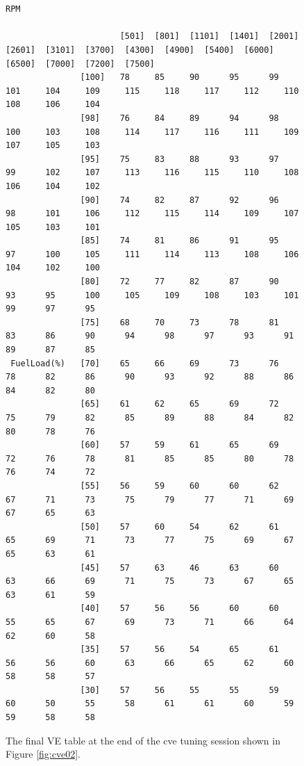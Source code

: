 \documentclass{article}
\begin{document}
\begin{figure}
\tiny
\begin{verbatim}

                                                                        RPM

                       [501]  [801]  [1101]  [1401]  [2001]  [2601]  [3101]  [3700]  [4300]  [4900]  [5400]  [6000]  [6500]  [7000]  [7200]  [7500]
               [100]   78     85     90      95      99      101     104     109     115     118     117     112     110     108     106     104   
               [98]    76     84     89      94      98      100     103     108     114     117     116     111     109     107     105     103   
               [95]    75     83     88      93      97      99      102     107     113     116     115     110     108     106     104     102   
               [90]    74     82     87      92      96      98      101     106     112     115     114     109     107     105     103     101   
               [85]    74     81     86      91      95      97      100     105     111     114     113     108     106     104     102     100   
               [80]    72     77     82      87      90      93      95      100     105     109     108     103     101     99      97      95    
               [75]    68     70     73      78      81      83      86      90      94      98      97      93      91      89      87      85    
 FuelLoad(%)   [70]    65     66     69      73      76      78      82      86      90      93      92      88      86      84      82      80    
               [65]    61     62     65      69      72      75      79      82      85      89      88      84      82      80      78      76    
               [60]    57     59     61      65      69      72      76      78      81      85      85      80      78      76      74      72    
               [55]    56     59     60      60      62      67      71      73      75      79      77      71      69      67      65      63    
               [50]    57     60     54      62      61      65      69      71      73      77      75      69      67      65      63      61    
               [45]    57     63     46      63      60      63      66      69      71      75      73      67      65      63      61      59    
               [40]    57     56     56      60      60      55      65      67      69      73      71      66      64      62      60      58    
               [35]    57     56     54      65      61      56      56      60      63      66      65      62      60      58      58      57    
               [30]    57     56     55      55      59      60      50      55      58      61      61      60      59      59      58      58    
\end{verbatim}
\caption{The final VE table at the end of the cve tuning session
shown in Figure \ref{fig:cve02}.}
\label{fig:cve03}
\end{figure}
\end{document}
